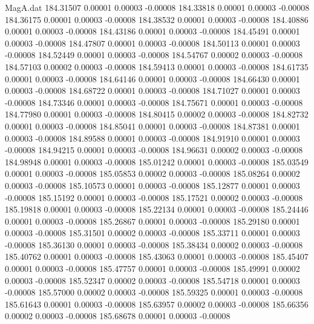 \begin{filecontents}{MagA.dat}
 184.31507    0.00001    0.00003   -0.00008
 184.33818    0.00001    0.00003   -0.00008
 184.36175    0.00001    0.00003   -0.00008
 184.38532    0.00001    0.00003   -0.00008
 184.40886    0.00001    0.00003   -0.00008
 184.43186    0.00001    0.00003   -0.00008
 184.45491    0.00001    0.00003   -0.00008
 184.47807    0.00001    0.00003   -0.00008
 184.50113    0.00001    0.00003   -0.00008
 184.52449    0.00001    0.00003   -0.00008
 184.54767    0.00002    0.00003   -0.00008
 184.57103    0.00002    0.00003   -0.00008
 184.59413    0.00001    0.00003   -0.00008
 184.61735    0.00001    0.00003   -0.00008
 184.64146    0.00001    0.00003   -0.00008
 184.66430    0.00001    0.00003   -0.00008
 184.68722    0.00001    0.00003   -0.00008
 184.71027    0.00001    0.00003   -0.00008
 184.73346    0.00001    0.00003   -0.00008
 184.75671    0.00001    0.00003   -0.00008
 184.77980    0.00001    0.00003   -0.00008
 184.80415    0.00002    0.00003   -0.00008
 184.82732    0.00001    0.00003   -0.00008
 184.85041    0.00001    0.00003   -0.00008
 184.87381    0.00001    0.00003   -0.00008
 184.89588    0.00001    0.00003   -0.00008
 184.91910    0.00001    0.00003   -0.00008
 184.94215    0.00001    0.00003   -0.00008
 184.96631    0.00002    0.00003   -0.00008
 184.98948    0.00001    0.00003   -0.00008
 185.01242    0.00001    0.00003   -0.00008
 185.03549    0.00001    0.00003   -0.00008
 185.05853    0.00002    0.00003   -0.00008
 185.08264    0.00002    0.00003   -0.00008
 185.10573    0.00001    0.00003   -0.00008
 185.12877    0.00001    0.00003   -0.00008
 185.15192    0.00001    0.00003   -0.00008
 185.17521    0.00002    0.00003   -0.00008
 185.19818    0.00001    0.00003   -0.00008
 185.22134    0.00001    0.00003   -0.00008
 185.24446    0.00001    0.00003   -0.00008
 185.26867    0.00001    0.00003   -0.00008
 185.29180    0.00001    0.00003   -0.00008
 185.31501    0.00002    0.00003   -0.00008
 185.33711    0.00001    0.00003   -0.00008
 185.36130    0.00001    0.00003   -0.00008
 185.38434    0.00002    0.00003   -0.00008
 185.40762    0.00001    0.00003   -0.00008
 185.43063    0.00001    0.00003   -0.00008
 185.45407    0.00001    0.00003   -0.00008
 185.47757    0.00001    0.00003   -0.00008
 185.49991    0.00002    0.00003   -0.00008
 185.52347    0.00002    0.00003   -0.00008
 185.54718    0.00001    0.00003   -0.00008
 185.57000    0.00002    0.00003   -0.00008
 185.59325    0.00001    0.00003   -0.00008
 185.61643    0.00001    0.00003   -0.00008
 185.63957    0.00002    0.00003   -0.00008
 185.66356    0.00002    0.00003   -0.00008
 185.68678    0.00001    0.00003   -0.00008

\end{filecontents}
